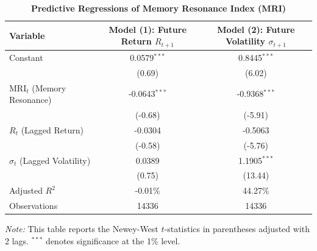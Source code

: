 
\begin{table}[htbp]
\centering
\caption{\textbf{Predictive Regressions of Memory Resonance Index (MRI)}}
\label{tab:mri_regression}
\begin{tabular}{lcc}
\hline\hline
Variable & Model (1): Future Return $R_{t+1}$ & Model (2): Future Volatility $\sigma_{t+1}$ \\
\hline
Constant & 0.0579$^{***}$ & 0.8445$^{***}$ \\
         & (0.69) & (6.02) \\
[0.8ex]
$\text{MRI}_t$ (Memory Resonance) & -0.0643$^{***}$ & -0.9368$^{***}$ \\
         & (-0.68) & (-5.91) \\
[0.8ex]
$R_t$ (Lagged Return) & -0.0304 & -0.5063 \\
         & (-0.58) & (-5.76) \\
[0.8ex]
$\sigma_t$ (Lagged Volatility) & 0.0389 & 1.1905$^{***}$ \\
         & (0.75) & (13.44) \\
\hline
Adjusted $R^2$ & -0.01\% & 44.27\% \\
Observations & 14336 & 14336 \\
\hline\hline
\end{tabular}
\begin{tablenotes}
\small
\item \textit{Note:} This table reports the Newey-West $t$-statistics in parentheses adjusted with 2 lags. 
$^{***}$ denotes significance at the 1\% level.
\end{tablenotes}
\end{table}
